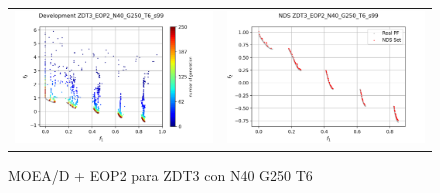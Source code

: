 \begin{figure}[H]
\begin{tabular}{c c}
    \includegraphics[scale=0.5]{figures/ZDT3_EOP2_N40_G250_T6/s99_dev.png} &
    \includegraphics[scale=0.5]{figures/ZDT3_EOP2_N40_G250_T6/s99_nds.png}\\
    \end{tabular}
    \caption{MOEA/D + EOP2 para ZDT3 con N40 G250 T6 }
    \label{fig:4}
\end{figure}


